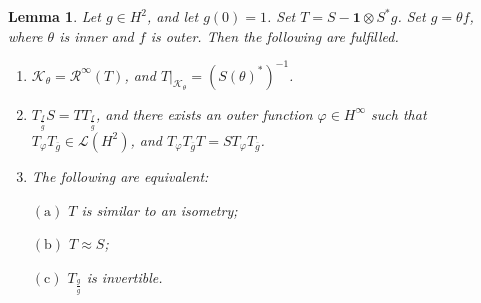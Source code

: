 \documentclass[a4paper,oneside,11pt]{amsart}
\numberwithin{equation}{section}
\theoremstyle{plain}
\newtheorem{lemma}[theorem]{Lemma}
\theoremstyle{definition}
\begin{document}
\begin{lemma} \label{lemgsimss} Let $g\in H^2$, and let $g(0)=1$. Set $T=S-\mathbf{1}\otimes S^*g$. Set $g=\theta f$, where $\theta$ is inner and $f$ is outer. Then the following are fulfilled. 
\begin{enumerate}[\upshape (i)]
\item  
 $\mathcal K_\theta=\mathcal R^\infty(T)$, and 
$T|_{\mathcal K_\theta}=(S(\theta)^*)^{-1}$. 
\item  
$T_{\frac{f}{\overline g}}S=TT_{\frac{f}{\overline g}}$, and  there exists an outer function $\varphi\in H^\infty$ such that
$T_\varphi T_{\overline g}\in\mathcal L(H^2)$, and $T_\varphi T_{\overline g}T=ST_\varphi T_{\overline g}$.
\item The following are equivalent: 

$\mathrm{(a)}$ $T$ is similar to an isometry;

$\mathrm{(b)}$ $T\approx S$;

$\mathrm{(c)}$  $T_{\frac{g}{\overline g}}$ is invertible.
\end{enumerate}
\end{lemma}
\end{document}
